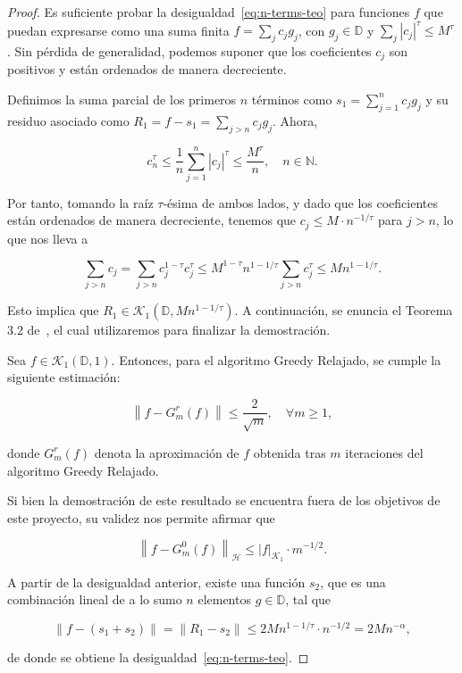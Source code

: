 \begin{proof}
    Es suficiente probar la desigualdad~\eqref{eq:n-terms-teo} para funciones $f$ que puedan expresarse como una suma finita $f = \sum_j c_j g_j$, con $g_j \in \mathbb{D}$ y $\sum_j |c_j|^\tau \leq M^\tau$. Sin pérdida de generalidad, podemos suponer que los coeficientes $c_j$ son positivos y están ordenados de manera decreciente.
    
    Definimos la suma parcial de los primeros $n$ términos como $s_1 = \sum_{j=1}^{n} c_j g_j$ y su residuo asociado como $R_1 = f - s_1 = \sum_{j>n} c_j g_j$. Ahora,

    \[
        c_n^\tau \leq \frac{1}{n} \sum_{j=1}^{n} |c_j|^\tau \leq \frac{M^\tau}{n}, \quad n \in \mathbb{N}.
    \]

    Por tanto, tomando la raíz $ \tau $-ésima de ambos lados, y dado que los coeficientes están ordenados de manera decreciente, tenemos que $ c_j \leq M \cdot n^{-1/\tau} $ para $ j > n $, lo que nos lleva a

    \[
        \sum_{j>n} c_j = \sum_{j>n} c_j^{1-\tau} c_j^\tau \leq M^{1-\tau} n^{1-1/\tau} \sum_{j>n} c_j^\tau \leq M n^{1-1/\tau}.
    \]

    Esto implica que $R_1 \in \mathcal{K}_1(\mathbb{D}, M n^{1 - 1/\tau})$. A continuación, se enuncia el Teorema $3.2$ de~\cite{DeVore1996}, el cual utilizaremos para finalizar la demostración.

    \begin{teorema}
        Sea $f \in \mathcal{K}_1(\mathbb{D}, 1)$. Entonces, para el algoritmo Greedy Relajado, se cumple la siguiente estimación:

        \[
            \left\| f - G_{m}^{r}(f) \right\| \leq \frac{2}{\sqrt{m}}, \quad \forall m \geq 1,
        \]

        donde $G_{m}^{r}(f)$ denota la aproximación de $f$ obtenida tras $m$ iteraciones del algoritmo Greedy Relajado.
    \end{teorema}

    Si bien la demostración de este resultado se encuentra fuera de los objetivos de este proyecto, su validez nos permite afirmar que

    \[
        \left\| f - G_{m}^{0}(f) \right\|_{\mathcal{H}} \leq |f|_{\mathcal{K}_1} \cdot m^{-1/2}.
    \]

    A partir de la desigualdad anterior, existe una función $s_2$, que es una combinación lineal de a lo sumo $n$ elementos $g \in \mathbb{D}$, tal que

    \[
        \| f - (s_1 + s_2) \| = \| R_1 - s_2 \| \leq 2M n^{1 - 1/\tau} \cdot n^{-1/2} = 2M n^{-\alpha},
    \]

    de donde se obtiene la desigualdad~\eqref{eq:n-terms-teo}.
\end{proof}

